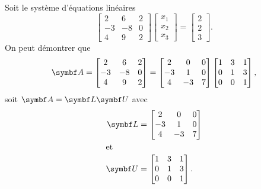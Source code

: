 \begin{exemple}
  Soit le système d'équations linéaires
  \begin{displaymath}
    \begin{bmatrix}
       2 &  6 & 2 \\
      -3 & -8 & 0 \\
       4 &  9 & 2
    \end{bmatrix}
    \begin{bmatrix}
      x_1 \\ x_2 \\ x_3
    \end{bmatrix}
    =
    \begin{bmatrix}
      2 \\ 2 \\ 3
    \end{bmatrix}.
  \end{displaymath}
  On peut démontrer que
  \begin{displaymath}
    \mat{A} =
    \begin{bmatrix}
       2 &  6 & 2 \\
      -3 & -8 & 0 \\
       4 &  9 & 2
    \end{bmatrix}
    =
    \begin{bmatrix}
       2 &  0 & 0 \\
      -3 &  1 & 0 \\
       4 & -3 & 7
    \end{bmatrix}
    \begin{bmatrix}
      1 & 3 & 1 \\
      0 & 1 & 3 \\
      0 & 0 & 1
    \end{bmatrix},
  \end{displaymath}
  soit $\mat{A} = \mat{L} \mat{U}$ avec
  \begin{align*}
    \mat{L} &=
    \begin{bmatrix}
       2 &  0 & 0 \\
      -3 &  1 & 0 \\
       4 & -3 & 7
    \end{bmatrix} \\
    \intertext{et}
    \mat{U} &=
    \begin{bmatrix}
      1 & 3 & 1 \\
      0 & 1 & 3 \\
      0 & 0 & 1
    \end{bmatrix}.
  \end{align*}

\end{exemple}
